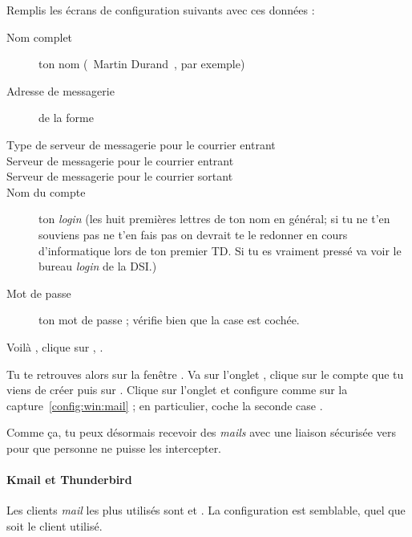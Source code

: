 Remplis les \'ecrans de configuration suivants avec ces donn\'ees :
\begin{description}
  \item[Nom complet] ton nom (\guillemotleft~Martin Durand~\guillemotright , par exemple)
  \item[Adresse de messagerie] de la forme 
  \item[Type de serveur de messagerie pour le courrier entrant] 
  \item[Serveur de messagerie pour le courrier entrant] 
  \item[Serveur de messagerie pour le courrier sortant] 
  \item[Nom du compte] ton \emph{login}  (les huit premi\`eres lettres de ton nom en g\'en\'eral; si tu ne t'en souviens pas ne t'en fais pas on devrait te le redonner en cours d'informatique lors de ton premier TD. Si tu es vraiment press\'e va voir le bureau \emph{login} de la DSI.)
  \item[Mot de passe] ton mot de passe  ;
       v\'erifie bien que la case  est coch\'ee.
\end{description}

Voil\`a , clique sur , .

Tu te retrouves alors sur la fen\^etre . Va sur
l'onglet , clique sur le compte que tu viens de cr\'eer
puis sur . Clique sur l'onglet  et
configure comme sur la capture~\ref{config:win:mail} ; en
particulier, coche la seconde case .

Comme \c{c}a, tu peux d\'esormais recevoir des \emph{mails} avec une liaison
s\'ecuris\'ee vers  pour que personne ne puisse les
intercepter.




\paragraph{Kmail et Thunderbird}

 Les clients \emph{mail} les plus
utilis\'es sont  et . La configuration est semblable, quel que soit le
client utilis\'e.

